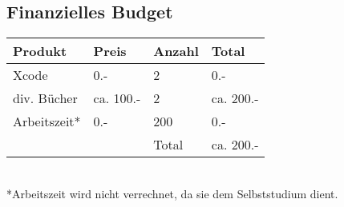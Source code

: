 \subsection{Finanzielles Budget}
\begin{tabularx}{\textwidth}{| X | X | X | X |}
\hline
\rowcolor[gray]{0.9} Produkt & Preis & Anzahl & Total\\
\hline
Xcode & 0.- & 2 & 0.-\\
\hline
div. Bücher & ca. 100.- & 2 & ca. 200.-\\
\hline
Arbeitszeit* & 0.- & 200 & 0.-\\
\hline
\rowcolor[gray]{0.9} &  & Total & ca. 200.-\\
\hline
\end{tabularx}
\\
*Arbeitszeit wird nicht verrechnet, da sie dem Selbststudium dient.